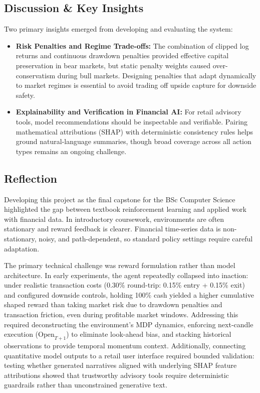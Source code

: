 \documentclass[11pt,a4paper]{article}
\begin{document}
\subsection{Discussion \& Key Insights}
Two primary insights emerged from developing and evaluating the system:
\begin{itemize}[leftmargin=2em, itemsep=2pt, parsep=0pt]
    \item \textbf{Risk Penalties and Regime Trade-offs:} The combination of clipped log returns and continuous drawdown penalties provided effective capital preservation in bear markets, but static penalty weights caused over-conservatism during bull markets. Designing penalties that adapt dynamically to market regimes is essential to avoid trading off upside capture for downside safety.
    \item \textbf{Explainability and Verification in Financial AI:} For retail advisory tools, model recommendations should be inspectable and verifiable. Pairing mathematical attributions (SHAP) with deterministic consistency rules helps ground natural-language summaries, though broad coverage across all action types remains an ongoing challenge.
\end{itemize}

\subsection{Reflection}
Developing this project as the final capstone for the BSc Computer Science highlighted the gap between textbook reinforcement learning and applied work with financial data. In introductory coursework, environments are often stationary and reward feedback is clearer. Financial time-series data is non-stationary, noisy, and path-dependent, so standard policy settings require careful adaptation.

The primary technical challenge was reward formulation rather than model architecture. In early experiments, the agent repeatedly collapsed into inaction: under realistic transaction costs (0.30\% round-trip: 0.15\% entry + 0.15\% exit) and configured downside controls, holding 100\% cash yielded a higher cumulative shaped reward than taking market risk due to drawdown penalties and transaction friction, even during profitable market windows. Addressing this required deconstructing the environment's MDP dynamics, enforcing next-candle execution ($\text{Open}_{T+1}$) to eliminate look-ahead bias, and stacking historical observations to provide temporal momentum context. Additionally, connecting quantitative model outputs to a retail user interface required bounded validation: testing whether generated narratives aligned with underlying SHAP feature attributions showed that trustworthy advisory tools require deterministic guardrails rather than unconstrained generative text.
\end{document}
